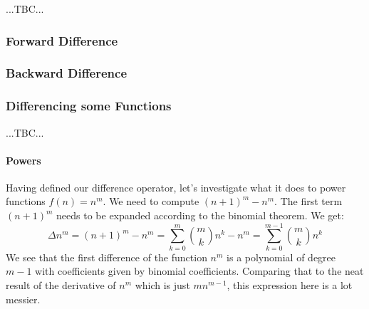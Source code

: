 ...TBC...


\subsubsection{Forward Difference}



\subsubsection{Backward Difference}






\subsubsection{Differencing some Functions} ...TBC...

\paragraph{Powers}
Having defined our difference operator, let's investigate what it does to power functions $f(n) = n^m$. We need to compute $(n+1)^m - n^m$. The first term $(n+1)^m$ needs to be expanded according to the binomial theorem. We get:
\begin{equation}
\Delta n^m = (n+1)^m                           - n^m
           = \sum_{k=0}^{m}   \binom{m}{k} n^k - n^m
           = \sum_{k=0}^{m-1} \binom{m}{k} n^k
\end{equation}
We see that the first difference of the function $n^m$ is a polynomial of degree $m-1$ with coefficients given by binomial coefficients. Comparing that to the neat result of the derivative of $n^m$ which is just $m n^{m-1}$, this expression here is a lot messier. 

